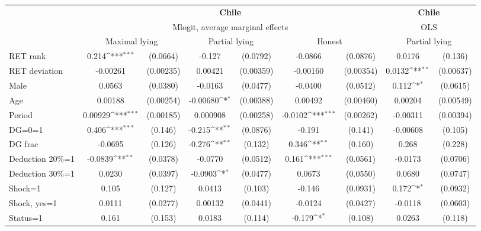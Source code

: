 \def\sym#1{\ifmmode^{#1}\else\(^{#1}\)\fi}
\begin{tabular}{l|cccccc|cc}
\hline\hline
&\multicolumn{6}{c|}{\bf Chile}&\multicolumn{2}{c}{\bf Chile}\\ &\multicolumn{6}{c|}{Mlogit, average marginal effects }&\multicolumn{2}{c}{OLS}\\
                &\multicolumn{2}{c}{Maximal lying}&\multicolumn{2}{c}{Partial lying}&\multicolumn{2}{c}{Honest}  &\multicolumn{2}{c}{Partial lying}\\
\hline
RET rank        &    0.214\sym{***}& (0.0664)&   -0.127         & (0.0792)&  -0.0866         & (0.0876)&   0.0176         &  (0.136)\\
RET deviation   & -0.00261         &(0.00235)&  0.00421         &(0.00359)& -0.00160         &(0.00354)&   0.0132\sym{**} &(0.00637)\\
Male            &   0.0563         & (0.0380)&  -0.0163         & (0.0477)&  -0.0400         & (0.0512)&    0.112\sym{*}  & (0.0615)\\
Age             &  0.00188         &(0.00254)& -0.00680\sym{*}  &(0.00388)&  0.00492         &(0.00460)&  0.00204         &(0.00549)\\
Period          &  0.00929\sym{***}&(0.00185)& 0.000908         &(0.00258)&  -0.0102\sym{***}&(0.00262)& -0.00311         &(0.00394)\\
DG=0=1          &    0.406\sym{***}&  (0.146)&   -0.215\sym{**} & (0.0876)&   -0.191         &  (0.141)& -0.00608         &  (0.105)\\
DG frac         &  -0.0695         &  (0.126)&   -0.276\sym{**} &  (0.132)&    0.346\sym{**} &  (0.160)&    0.268         &  (0.228)\\
Deduction 20\%=1&  -0.0839\sym{**} & (0.0378)&  -0.0770         & (0.0512)&    0.161\sym{***}& (0.0561)&  -0.0173         & (0.0706)\\
Deduction 30\%=1&   0.0230         & (0.0397)&  -0.0903\sym{*}  & (0.0477)&   0.0673         & (0.0550)&   0.0680         & (0.0747)\\
Shock=1         &    0.105         &  (0.127)&   0.0413         &  (0.103)&   -0.146         & (0.0931)&    0.172\sym{*}  & (0.0932)\\
Shock, yes=1    &   0.0111         & (0.0277)&  0.00132         & (0.0441)&  -0.0124         & (0.0427)&  -0.0118         & (0.0603)\\
Status=1        &    0.161         &  (0.153)&   0.0183         &  (0.114)&   -0.179\sym{*}  &  (0.108)&   0.0263         &  (0.118)\\

\end{tabular}

